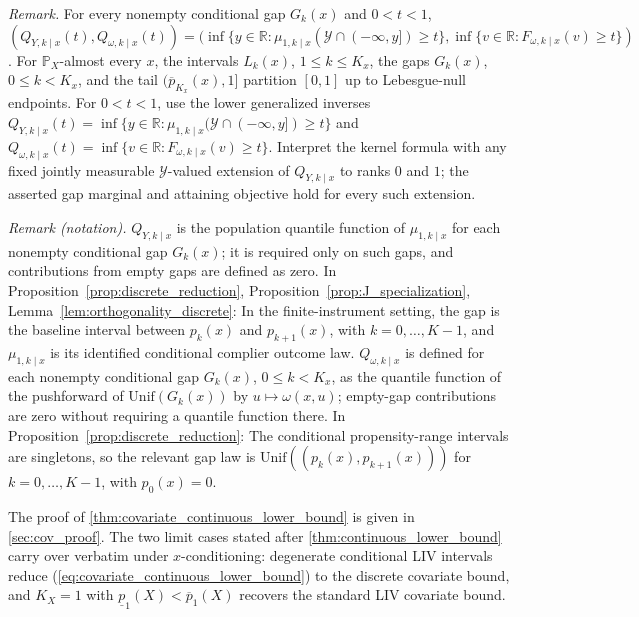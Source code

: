 \noindent\textit{Remark.} For every nonempty conditional gap $G_k(x)$ and $0<t<1$, $(Q_{Y,k\mid x}(t),Q_{\omega,k\mid x}(t))=(\inf\{y\in\mathbb R:\mu_{1,k\mid x}(\mathcal Y\cap(-\infty,y])\geqslant t\},\inf\{v\in\mathbb R:F_{\omega,k\mid x}(v)\geqslant t\})$. For $\mathbb P_X$-almost every $x$, the intervals $L_k(x)$, $1\leqslant k\leqslant K_x$, the gaps $G_k(x)$, $0\leqslant k<K_x$, and the tail $(\overline p_{K_x}(x),1]$ partition $[0,1]$ up to Lebesgue-null endpoints. For $0<t<1$, use the lower generalized inverses $Q_{Y,k\mid x}(t)=\inf\{y\in\mathbb R:\mu_{1,k\mid x}(\mathcal Y\cap(-\infty,y])\geqslant t\}$ and $Q_{\omega,k\mid x}(t)=\inf\{v\in\mathbb R:F_{\omega,k\mid x}(v)\geqslant t\}$. Interpret the kernel formula with any fixed jointly measurable $\mathcal Y$-valued extension of $Q_{Y,k\mid x}$ to ranks $0$ and $1$; the asserted gap marginal and attaining objective hold for every such extension.

\noindent\textit{Remark (notation).} $Q_{Y,k\mid x}$ is the population quantile function of $\mu_{1,k\mid x}$ for each nonempty conditional gap $G_k(x)$; it is required only on such gaps, and contributions from empty gaps are defined as zero. In Proposition~\ref{prop:discrete_reduction}, Proposition~\ref{prop:J_specialization}, Lemma~\ref{lem:orthogonality_discrete}: In the finite-instrument setting, the gap is the baseline interval between $p_k(x)$ and $p_{k+1}(x)$, with $k=0,\ldots,K-1$, and $\mu_{1,k\mid x}$ is its identified conditional complier outcome law. $Q_{\omega,k\mid x}$ is defined for each nonempty conditional gap $G_k(x)$, $0\leqslant k<K_x$, as the quantile function of the pushforward of $\mathrm{Unif}(G_k(x))$ by $u\mapsto\omega(x,u)$; empty-gap contributions are zero without requiring a quantile function there. In Proposition~\ref{prop:discrete_reduction}: The conditional propensity-range intervals are singletons, so the relevant gap law is $\mathrm{Unif}((p_k(x),p_{k+1}(x)))$ for $k=0,\ldots,K-1$, with $p_0(x)=0$.

The proof of \cref{thm:covariate_continuous_lower_bound} is given in \cref{sec:cov_proof}. The two limit cases stated after \cref{thm:continuous_lower_bound} carry over verbatim under $x$-conditioning: degenerate conditional LIV intervals reduce (\ref{eq:covariate_continuous_lower_bound}) to the discrete covariate bound, and $K_X = 1$ with $\underline{p}_1(X) < \overline{p}_1(X)$ recovers the standard LIV covariate bound.
